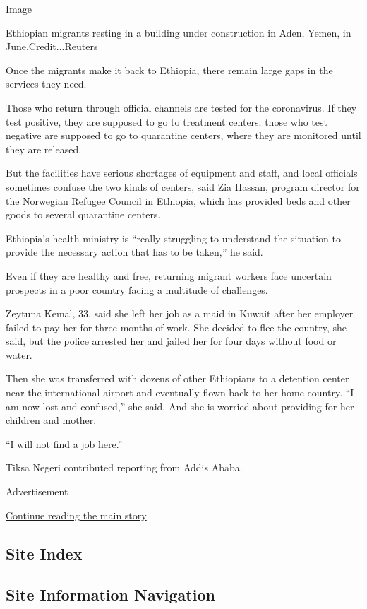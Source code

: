 Image

Ethiopian migrants resting in a building under construction in Aden,
Yemen, in June.Credit...Reuters

Once the migrants make it back to Ethiopia, there remain large gaps in
the services they need.

Those who return through official channels are tested for the
coronavirus. If they test positive, they are supposed to go to treatment
centers; those who test negative are supposed to go to quarantine
centers, where they are monitored until they are released.

But the facilities have serious shortages of equipment and staff, and
local officials sometimes confuse the two kinds of centers, said Zia
Hassan, program director for the Norwegian Refugee Council in Ethiopia,
which has provided beds and other goods to several quarantine centers.

Ethiopia's health ministry is ``really struggling to understand the
situation to provide the necessary action that has to be taken,'' he
said.

Even if they are healthy and free, returning migrant workers face
uncertain prospects in a poor country facing a multitude of challenges.

Zeytuna Kemal, 33, said she left her job as a maid in Kuwait after her
employer failed to pay her for three months of work. She decided to flee
the country, she said, but the police arrested her and jailed her for
four days without food or water.

Then she was transferred with dozens of other Ethiopians to a detention
center near the international airport and eventually flown back to her
home country. ``I am now lost and confused,'' she said. And she is
worried about providing for her children and mother.

``I will not find a job here.''

Tiksa Negeri contributed reporting from Addis Ababa.

Advertisement

\protect\hyperlink{after-bottom}{Continue reading the main story}

\hypertarget{site-index}{%
\subsection{Site Index}\label{site-index}}

\hypertarget{site-information-navigation}{%
\subsection{Site Information
Navigation}\label{site-information-navigation}}

